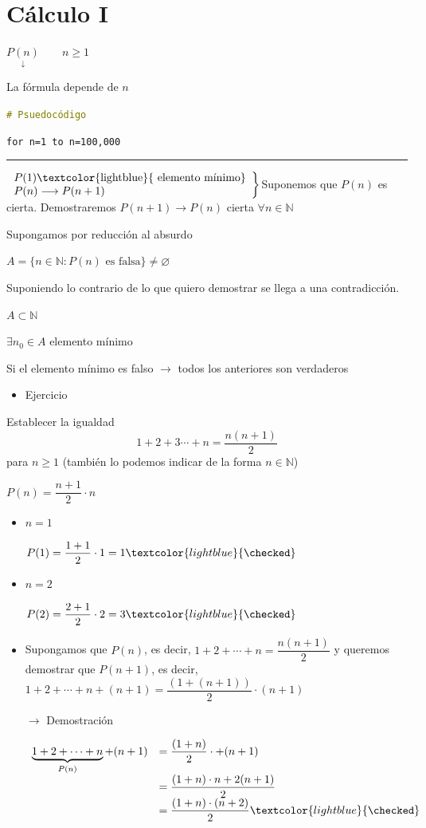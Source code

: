 \documentclass[12pt]{article}
\begin{document}
\section*{Cálculo I}

$\underset{\displaystyle\downarrow}{P(n)}\qquad n\ge 1$

La fórmula depende de $n$

\textcolor{olive}{\texttt{\# Psuedocódigo}}

\texttt{for n=1 to n=100,000}\\

\hrule

$\left.\begin{array}{l}
	P(1) \text{\textcolor{lightblue}{ elemento mínimo}}\\
	P(n)\longrightarrow P(n+1)
\end{array}\right\}$Suponemos que $P(n)$ es cierta. Demostraremos $P(n+1) \rightarrow P(n)$ cierta $\forall n\in \mathbb{N}$

Supongamos por reducción al absurdo

$A=\{n\in\mathbb{N}:P(n) \text{ es falsa}\}\neq\varnothing$

Suponiendo lo contrario de lo que quiero demostrar se llega a una contradicción.

$A\subset\mathbb{N}$

$\exists n_0\in A$ elemento mínimo

Si el elemento mínimo es falso $\longrightarrow$ todos los anteriores son verdaderos
\begin{itemize}[label=\color{red}\textbullet, leftmargin=*]
	\item \color{lightblue}Ejercicio
\end{itemize}
{\color{lightblue} Establecer la igualdad \[ 1+2+3\cdots+n=\dfrac{n(n+1)}{2} \] para $n\ge1$ (también lo podemos indicar de la forma $n\in\mathbb{N}$)}

$P(n)=\dfrac{n+1}{2}\cdot n$

\begin{itemize}[leftmargin=*]
	\item $n=1$
	
	$P(1)=\dfrac{1+1}{2}\cdot 1=1\textcolor{lightblue}{\checked}$
	
	\item $n=2$
	
	$P(2)=\dfrac{2+1}{2}\cdot 2=3\textcolor{lightblue}{\checked}$
	
	\item Supongamos que $P(n)$, es decir, $1+2+\cdots+n=\dfrac{n(n+1)}{2}$ y queremos demostrar que $P(n+1)$, es decir,  $1+2+\cdots+n+(n+1)=\dfrac{(1+(n+1))}{2}\cdot(n+1)$
	
	\item[$\longrightarrow$] Demostración
	
	$\begin{array}{ll}
		\underbrace{1+2+\cdots+n}_{P(n)}+(n+1) & =\dfrac{(1+n)}{2}\cdot+(n+1)\\
		&=\dfrac{(1+n)\cdot n+2(n+1)}{2}\\
		&=\dfrac{(1+n)\cdot(n+2)}{2} \textcolor{lightblue}{\checked}
	\end{array}$
\end{itemize}
\end{document}
